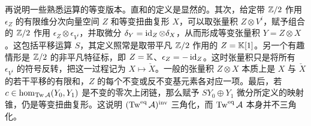 再说明一些熟悉运算的等变版本。直和的定义是显然的。其次，给定带 $\mathbb Z/2$ 作用 $\epsilon_Z$ 的有限维分次向量空间 $Z$ 和等变扭曲复形 $X$，可以取张量积 $Z\otimes V^i$，赋予组合的 $\mathbb Z/2$ 作用 $\epsilon_Z\otimes\epsilon_{V^i}$，并取微分 $\delta_Y=\operatorname{id}_Z\otimes\delta_X$，从而形成等变张量积 $Y=Z\otimes X$。这包括平移运算 $S$，其定义照常是取带平凡 $\mathbb Z/2$ 作用的 $Z=\mathbb K[1]$。另一个有趣情形是 $\mathbb Z/2$ 的非平凡特征标，即 $Z=\mathbb K$、$\epsilon_Z=-\operatorname{id}_Z$。这时张量积只是将所有 $\epsilon_{V^i}$ 的符号反转，把这一过程记为 $X\mapsto\check X$。一般的张量积 $Z\otimes X$ 本质上是 $X$ 与 $\check X$ 的若干平移的有限和，$Z$ 的每个不变或反不变基元素各对应一项。最后，若 $c\in\hom_{\operatorname{Tw}\mathcal A}(Y_0,Y_1)$ 是不变的零次上闭链，那么赋予 $SY_0\oplus Y_1$ 微分所定义的映射锥，仍是等变扭曲复形。这说明 $(\operatorname{Tw}^{\mathrm{eq}}\mathcal A)^{\mathrm{inv}}$ 三角化，而 $\operatorname{Tw}^{\mathrm{eq}}\mathcal A$ 本身并不三角化。

